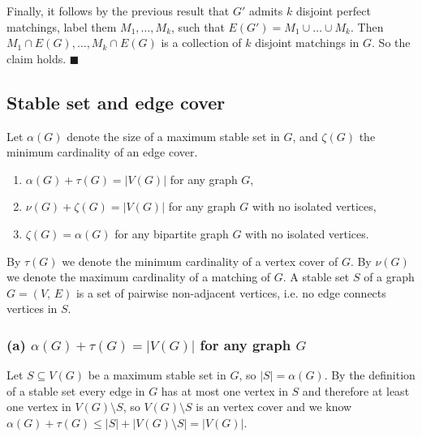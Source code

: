 \documentclass{article}
\begin{document}
Finally, it follows by the previous result that $G'$ admits $k$ disjoint perfect matchings, label them $M_1,\dots,M_k$, such that $E(G')=M_1\cup \dots \cup M_k.$ Then $M_1\cap E(G),\dots ,M_k\cap E(G)$ is a collection of $k$ disjoint matchings in $G.$ So the claim holds. $\blacksquare$






  \subsection{Stable set and edge cover}
  \begin{centerframebox}
    Let $\alpha(G)$ denote the size of a maximum stable set in $G$, and $\zeta(G)$ the minimum cardinality of an edge cover.

    \begin{enumerate}[label=(\alph*)]
      \item $\alpha(G) + \tau(G) = |V(G)|$ for any graph $G$,
      \item $\nu(G) + \zeta(G) = |V(G)|$ for any graph $G$ with no isolated vertices,
      \item $\zeta(G) = \alpha(G)$ for any bipartite graph $G$ with no isolated vertices.
    \end{enumerate}

    By $\tau(G)$ we denote the minimum cardinality of a vertex cover of $G$.
    By $\nu(G)$ we denote the maximum cardinality of a matching of $G$.
    A stable set $S$ of a graph $G = (V,\, E)$ is a set of pairwise non-adjacent vertices,
    i.e. no edge connects vertices in $S$.
  \end{centerframebox}

\subsubsection*{(a) $\alpha(G) + \tau(G) = |V(G)|$ for any graph $G$}
Let $S\subseteq V(G)$ be a maximum stable set in $G$, so $|S|=\alpha(G)$. By the definition of a stable set every edge in $G$ has at most one vertex in $S$ and therefore at least one vertex in $V(G)\setminus S$, so $V(G)\setminus S$ is an vertex cover and we know $\alpha(G) + \tau(G)\leq |S|+ |V(G)\setminus S|= |V(G)|$.
\end{document}
